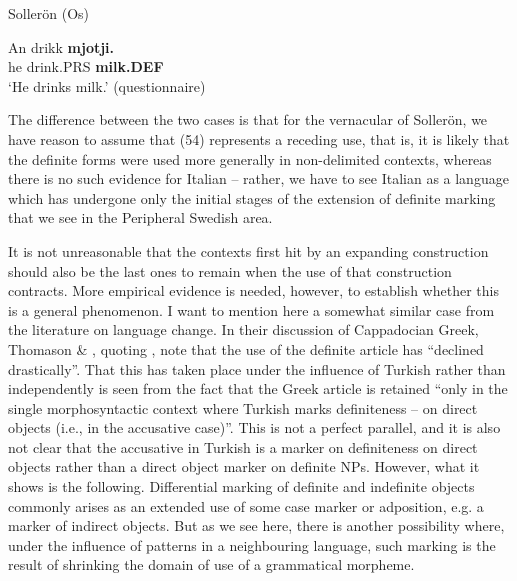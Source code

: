 	  Sollerön (Os) 


 \ea\label{}
\gll An  drikk  \textbf{mjotji.}\\


he  drink.PRS  \textbf{milk.DEF}\\

\glt ‘He drinks milk.’ (questionnaire)

\z

The difference between the two cases is that for the vernacular of Sollerön, we have reason to assume that (54) represents a receding use, that is, it is likely that the definite forms were used more generally in non-delimited contexts, whereas there is no such evidence for Italian – rather, we have to see Italian as a language which has undergone only the initial stages of the extension of definite marking that we see in the Peripheral Swedish area. 


It is not unreasonable that the contexts first hit by an expanding construction should also be the last ones to remain when the use of that construction contracts. More empirical evidence is needed, however, to establish whether this is a general phenomenon. I want to mention here a somewhat similar case from the literature on language change. In their discussion of Cappadocian Greek, Thomason \& \citet{Kaufman1988}, quoting \citet{Dawkins1916}, note that the use of the definite article has “declined drastically”. That this has taken place under the influence of Turkish rather than independently is seen from the fact that the Greek article is retained “only in the single morphosyntactic context where Turkish marks definiteness – on direct objects (i.e., in the accusative case)”. This is not a perfect parallel, and it is also not clear that the accusative in Turkish is a marker on definiteness on direct objects rather than a direct object marker on definite NPs. However, what it shows is the following. Differential marking of definite and indefinite objects commonly arises as an extended use of some case marker or adposition, e.g. a marker of indirect objects. But as we see here, there is another possibility where, under the influence of patterns in a neighbouring language, such marking is the result of shrinking the domain of use of a grammatical morpheme. 

